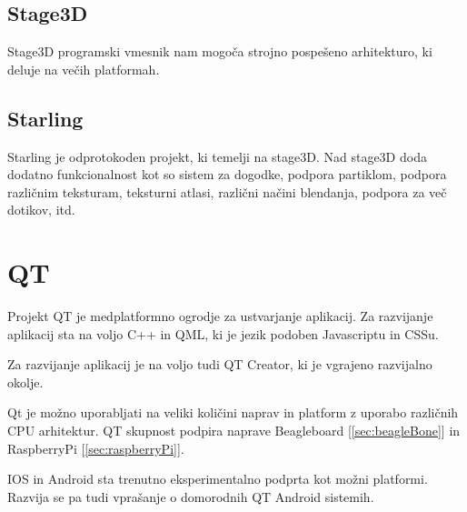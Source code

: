 \subsection{Stage3D}

Stage3D programski vmesnik nam mogoča strojno pospešeno arhitekturo, ki deluje na večih platformah. 

\subsection{Starling}

Starling je odprotokoden projekt, ki temelji na stage3D. Nad stage3D doda dodatno funkcionalnost kot so sistem za dogodke, podpora partiklom, podpora različnim teksturam, teksturni atlasi, različni načini blendanja, podpora za več dotikov, itd.

\section{QT}
\label{sec:qt}

Projekt QT je medplatformno ogrodje za ustvarjanje aplikacij. Za razvijanje aplikacij sta na voljo C++ in QML, ki je jezik podoben Javascriptu in CSSu.

Za razvijanje aplikacij je na voljo tudi QT Creator, ki je vgrajeno razvijalno okolje.

Qt je možno uporabljati na veliki količini naprav in platform z uporabo različnih CPU arhitektur. QT skupnost podpira naprave Beagleboard [\ref{sec:beagleBone}] in RaspberryPi [\ref{sec:raspberryPi}]. 

IOS in Android sta trenutno eksperimentalno podprta kot možni platformi. Razvija se pa tudi vprašanje o domorodnih QT Android sistemih. %